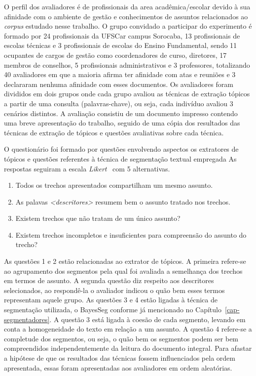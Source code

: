 O perfil dos avaliadores é de profissionais da area acadêmica/escolar devido à sua afinidade com o ambiente de gestão e conhecimentos de assuntos relacionados ao \textit{corpus} estudado nesse trabalho. O grupo convidado a participar do experimento é formado por 24 profissionais da UFSCar campus Sorocaba, 13 profissionais de escolas técnicas e 3 profissionais de escolas do Ensino Fundamental, sendo 11 ocupantes de cargos de gestão como coordenadores de curso, diretores, 17 membros de conselhos, 5 profissionais administrativos e 3 professores, totalizando 40 avaliadores em que a maioria afirma ter afinidade com atas e reuniões e 3 declararam nenhuma afinidade com esses documentos. Os avaliadores foram divididos em dois grupos onde cada grupo avaliou as técnicas de extração tópicos a partir de uma consulta (palavras-chave), ou seja, cada indivíduo avaliou 3 cenários distintos. A avaliação consistiu de um documento impresso contendo uma breve apresentação do trabalho, seguido de uma cópia dos resultados das técnicas de extração de tópicos e questões avaliativas sobre cada técnica.


O questionário foi formado por questões envolvendo aspectos os extratores de tópicos e questões referentes à técnica de segmentação textual empregada
As respostas seguiram a escala \textit{Likert}~\cite{Norman2010} com 5 alternativas. 

\begin{enumerate}
	\item Todos os trechos apresentados compartilham um mesmo assunto.
	\item As palavas \textit{<descritores>} resumem bem o assunto tratado nos trechos.
	\item Existem trechos que não tratam de um único assunto?
	\item Existem trechos incompletos e insuficientes para compreensão do assunto do trecho?
\end{enumerate}


As questões 1 e 2 estão relacionadas ao extrator de tópicos. A primeira refere-se ao agrupamento dos segmentos pela qual foi avaliada a semelhança dos trechos em termos de assunto. A segunda questão diz respeito aos descritores selecionados, ao respondê-la o avaliador indicou o quão bem esses termos representam aquele grupo.
As questões 3 e 4 estão ligadas à técnica de segmentação utilizada, o BayesSeg conforme já mencionado no Capítulo~\ref{cap-segmentadores}. A questão 3 está ligada à coesão de cada segmento, levando em conta a homogeneidade do texto em relação a um assunto. A questão 4 refere-se a completude dos segmentos, ou seja, o quão bem os segmentos podem ser bem compreendidos independentemente da leitura do documento integral.
Para afastar a hipótese de que os resultados das técnicas fossem influenciados pela ordem apresentada, essas foram apresentadas aos avaliadores em ordem aleatórias.




